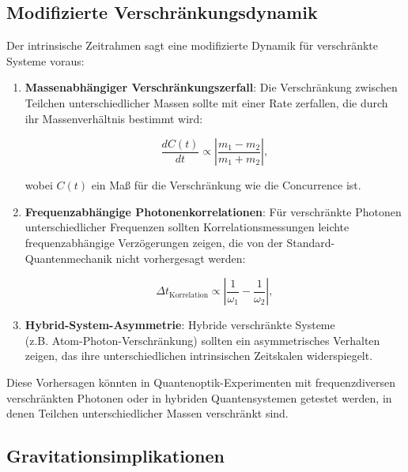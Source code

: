 \documentclass[12pt,a4paper]{article}
\begin{document}
	\subsection{Modifizierte Verschränkungsdynamik}
	\label{subsec:entanglement_dynamics}
	
	Der intrinsische Zeitrahmen sagt eine modifizierte Dynamik für verschränkte Systeme voraus:
	
	\begin{enumerate}
		\item \textbf{Massenabhängiger Verschränkungszerfall}: Die Verschränkung zwischen Teilchen unterschiedlicher Massen sollte mit einer Rate zerfallen, die durch ihr Massenverhältnis bestimmt wird:
		
		\begin{equation}
			\frac{dC(t)}{dt} \propto \left|\frac{m_1 - m_2}{m_1 + m_2}\right|,
			\label{eq:entanglement_decay}
		\end{equation}
		
		wobei $C(t)$ ein Maß für die Verschränkung wie die Concurrence ist.
		
		\item \textbf{Frequenzabhängige Photonenkorrelationen}: Für verschränkte Photonen unterschiedlicher Frequenzen sollten Korrelationsmessungen leichte frequenzabhängige Verzögerungen zeigen, die von der Standard-Quantenmechanik nicht vorhergesagt werden:
		
		\begin{equation}
			\Delta t_{\text{Korrelation}} \propto \left|\frac{1}{\omega_1} - \frac{1}{\omega_2}\right|,
			\label{eq:frequency_delay}
		\end{equation}
		
		\item \textbf{Hybrid-System-Asymmetrie}: Hybride verschränkte Systeme \\(z.B. Atom-Photon-Verschränkung) sollten ein asymmetrisches Verhalten zeigen, das ihre unterschiedlichen intrinsischen Zeitskalen widerspiegelt.
	\end{enumerate}
	
	Diese Vorhersagen könnten in Quantenoptik-Experimenten mit frequenzdiversen verschränkten Photonen oder in hybriden Quantensystemen getestet werden, in denen Teilchen unterschiedlicher Massen verschränkt sind.
	
	\subsection{Gravitationsimplikationen}
	\label{subsec:gravitational_implications}
	
\end{document}
